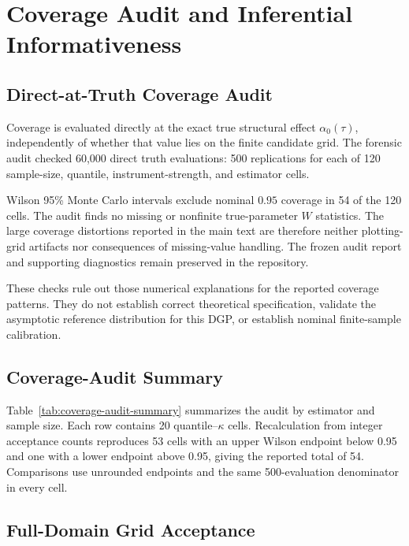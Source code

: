 \section{Coverage Audit and Inferential Informativeness}
\label{app:coverage-forensic-audit}

\subsection{Direct-at-Truth Coverage Audit}

Coverage is evaluated directly at the exact true structural effect $\alpha_0(\tau)$, independently of whether that value lies on the finite candidate grid. The forensic audit checked 60,000 direct truth evaluations: 500 replications for each of 120 sample-size, quantile, instrument-strength, and estimator cells.

Wilson 95\% Monte Carlo intervals exclude nominal $0.95$ coverage in 54 of the 120 cells. The audit finds no missing or nonfinite true-parameter $W$ statistics. The large coverage distortions reported in the main text are therefore neither plotting-grid artifacts nor consequences of missing-value handling. The frozen audit report and supporting diagnostics remain preserved in the repository.

These checks rule out those numerical explanations for the reported coverage patterns. They do not establish correct theoretical specification, validate the asymptotic reference distribution for this DGP, or establish nominal finite-sample calibration.

\subsection{Coverage-Audit Summary}

Table~\ref{tab:coverage-audit-summary} summarizes the audit by estimator and sample size. Each row contains 20 quantile--$\kappa$ cells. Recalculation from integer acceptance counts reproduces 53 cells with an upper Wilson endpoint below 0.95 and one with a lower endpoint above 0.95, giving the reported total of 54. Comparisons use unrounded endpoints and the same 500-evaluation denominator in every cell.


\FloatBarrier

\subsection{Full-Domain Grid Acceptance}

